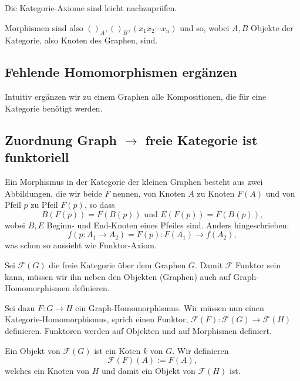 \documentclass[a4paper]{amsart}
\theoremstyle{definition}
\newcommand{\FF}{\ensuremath{\mathcal{ F }}}
\begin{document}
Die Kategorie-Axiome sind leicht nachzuprüfen.

Morphismen sind also $()_A, ()_B, (x_1x_2\cdots x_n)$ und so, wobei $A,B$ Objekte der Kategorie, also Knoten des Graphen, sind.

\subsection{Fehlende Homomorphismen ergänzen}
Intuitiv ergänzen wir zu einem Graphen alle Kompositionen, die für eine Kategorie benötigt werden.

\subsection{Zuordnung Graph $\rightarrow$ freie Kategorie ist funktoriell}
Ein Morphismus in der Kategorie der kleinen Graphen besteht aus zwei Abbildungen, die wir beide $F$ nennen, von Knoten $A$ zu Knoten $F(A)$ und von Pfeil $p$ zu Pfeil $F(p)$, so dass
\begin{equation}\label{graphMorphismus}
   B(F(p)) = F(B(p)) \text{ und } E(F(p)) = F(B(p)),
\end{equation} 
wobei $B,E$ Beginn- und End-Knoten eines Pfeiles sind. Anders hingeschrieben:
\begin{equation}
   f( p \colon A_1 \to A_2 ) = F(p) \colon F(A_1) \to f(A_2),
\end{equation}
was schon so aussieht wie Funktor-Axiom.

Sei $\FF(G)$ die freie Kategorie über dem Graphen $G$. Damit $\FF$ Funktor sein kann, müssen wir ihn neben den Objekten (Graphen) auch auf Graph-Homomorphismen definieren. 

Sei dazu $F \colon G \to H$ ein Graph-Homomorphismus. Wir müssen nun einen Kategorie-Homomorphismus, sprich einen Funktor, $\FF(F) \colon \FF(G) \to \FF(H)$ definieren. Funktoren werden auf Objekten und auf Morphismen definiert. 

Ein Objekt von $\FF(G)$ ist ein Koten $k$ von $G$. Wir definieren
\begin{equation}
   \FF(F)(A) := F(A),
\end{equation}
welches ein Knoten von $H$ und damit ein Objekt von $\FF(H)$ ist.
\end{document}
